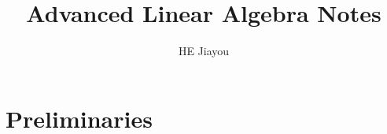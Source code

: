 \documentclass[]{report}
\title{Advanced Linear Algebra Notes}
\author{HE Jiayou}
\begin{document}
\maketitle
\tableofcontents

\chapter{Preliminaries}

\end{document}
